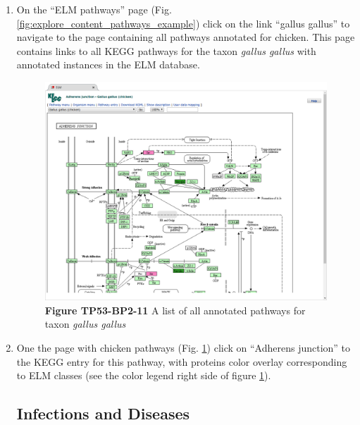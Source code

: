 \begin{enumerate}
\item On the ``ELM pathways'' page
	(Fig.  \ref{fig:explore_content_pathways_example})
	click on the link ``gallus
	gallus'' to navigate to the page containing all pathways annotated for
	chicken. This page contains links to all KEGG pathways for the taxon
	\emph{gallus gallus} with annotated instances in the ELM database.

\begin{figure}[h!]
	\centering
	\includegraphics[width=\textwidth]{Figures/explore_content/pathways_kegg.png} 
	\caption{
	\textbf{Figure TP53-BP2-11}
	A list of all annotated pathways for taxon \emph{gallus gallus}
	}
	\label{fig:explore_content_pathways_kegg}
\end{figure}

\item One the page with chicken pathways
	(Fig. \ref{fig:explore_content_pathways_kegg})
	click on ``Adherens
	junction'' to the KEGG entry for this pathway, with proteins color
	overlay corresponding to ELM classes (see the color legend right side
	of figure \ref{fig:explore_content_pathways_kegg}).

\subsection{Infections and Diseases}\label{infections-and-diseases}


\end{enumerate}
